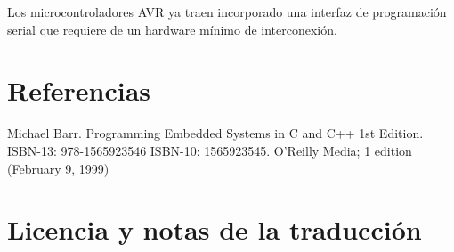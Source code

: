 \documentclass[output=paper, 
colorlinks,
citecolor=brown,
newtxmath
]{langscibook}
\begin{document}
Los microcontroladores AVR ya traen incorporado una interfaz
de programación serial que requiere de un hardware mínimo
de interconexión.





\pagebreak

\section{Referencias}

Michael Barr. Programming Embedded Systems in C and C++ 1st Edition. ISBN-13: 978-1565923546
ISBN-10: 1565923545. O'Reilly Media; 1 edition (February 9, 1999)


\section*{Licencia y notas de la traducción}
\end{document}
